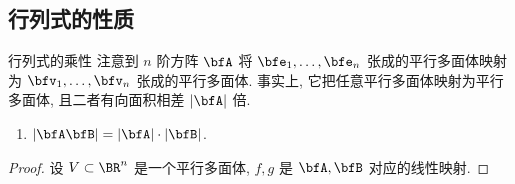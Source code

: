 \subsection{行列式的性质}

\begin{frame}{行列式的乘性}
	\onslide<+->
	注意到 $n$ 阶方阵 $\bfA$ 将 $\bfe_1,\dots,\bfe_n$ 张成的平行多面体映射为 $\bfv_1,\dots,\bfv_n$ 张成的平行多面体.
	\onslide<+->
	事实上, 它把任意平行多面体映射为平行多面体, 且二者有向面积相差 $|\bfA|$ 倍.
	\onslide<+->
	\begin{second@}
		\begin{enumerate}
			\item $|\bfA\bfB|=|\bfA|\cdot|\bfB|$.
		\end{enumerate}
	\end{second@}
	\onslide<+->
	\begin{proof}
		设 $V\subset \BR^n$ 是一个平行多面体, $f,g$ 是 $\bfA,\bfB$ 对应的线性映射.
		\onslide<+->{%
			故 $|\bfA\bfB|=|\bfA|\cdot|\bfB|$.\qedhere
		}
	\end{proof}
\end{frame}


